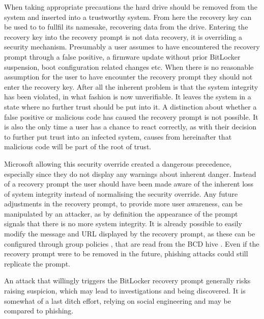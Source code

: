 When taking appropriate precautions the hard drive should be removed from the system and inserted into a trustworthy system.
From here the recovery key can be used to to fullfil its namesake, recovering data from the drive.
Entering the recovery key into the recovery prompt is not data recovery, it is overriding a security mechanism.
Presumably a user assumes to have encountered the recovery prompt through a false positive, a firmware update without prior BitLocker suspension, boot configuration related changes etc.
When there is no reasonable assumption for the user to have encounter the recovery prompt they should not enter the recovery key.
After all the inherent problem is that the system integrity has been violated, in what fashion is now unverifiable.
It leaves the system in a state where no further trust should be put into it.
A distinction about whether a false positive or malicious code has caused the recovery prompt is not possible.
It is also the only time a user has a chance to react correctly, as with their decision to further put trust into an infected system, causes from hereinafter that malicious code will be part of the root of trust.

Microsoft allowing this security override created a dangerous precedence, especially since they do not display any warnings about inherent danger.
Instead of a recovery prompt the user should have been made aware of the inherent loss of system integrity instead of normalising the security override.
Any future adjustments in the recovery prompt, to provide more user awareness, can be manipulated by an attacker, as by definition the appearance of the prompt signals that there is no more system integrity.
It is already possible to  easily modify the message and \ac{URL} displayed by the recovery prompt, as these can be configured through group policies \cite{microsoft-windows-bitlocker-group-policy-settings-url}, that are read from the \ac{BCD} hive \cite{microsoft-windows-bcd-settings-and-bitlocker}.
Even if the recovery prompt were to be removed in the future, phishing attacks could still replicate the prompt.

An attack that willingly triggers the BitLocker recovery prompt generally risks raising suspicion, which may lead to investigations and being discovered.
It is somewhat of a last ditch effort, relying on social engineering and may be compared to phishing.





